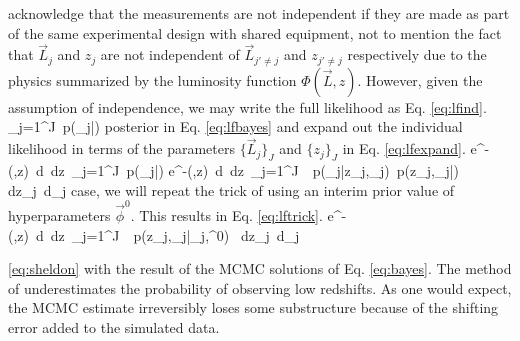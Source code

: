 \documentclass[preprint]{aastex}
\begin{document}
acknowledge that the measurements are not independent if they are made as part 
of the same experimental design with shared equipment, not to mention the fact 
that $\vec{L}_{j}$ and $z_{j}$ are not independent of $\vec{L}_{j'\neq j}$ and 
$z_{j'\neq j}$ respectively due to the physics summarized by the luminosity 
function $\Phi(\vec{L},z)$.  However, given the assumption of independence, we 
may write the full likelihood as Eq. \ref{eq:lfind}.  
%
\prod_{j=1}^{J}\ p(_{j}|\vec{\phi})
%
posterior in Eq. \ref{eq:lfbayes} and expand out the individual likelihood in 
terms of the parameters $\{\vec{L}_{j}\}_{J}$ and $\{z_{j}\}_{J}$ in Eq. 
\ref{eq:lfexpand}.
%
e^{-\iint \Phi(,z)\ 
d\ dz}\ \prod_{j=1}^{J}\ p(_{j}|\vec{\phi})
%
e^{-\iint \Phi(,z)\ 
d\ dz}\ \prod_{j=1}^{J}\ \iint\ p(_{j}|z_{j},_{j})\ 
p(z_{j},_{j}|\vec{\phi}) dz_{j}\ d_{j}
%
case, we will repeat the trick of using an interim prior value of 
hyperparameters $\vec{\phi}^{0}$.  This results in Eq. \ref{eq:lftrick}.
%
e^{-\iint \Phi(,z)\ 
d\ dz}\ \prod_{j=1}^{J}\ \iint\ 
p(z_{j},_{j}|_{j},\vec{\phi}^{0})\ 
dz_{j}\ d\vec{L}_{j}

\ref{eq:sheldon} with the result of the MCMC solutions of Eq. \ref{eq:bayes}.  
The method of \citet{Sheldon2012} underestimates the probability of observing 
low redshifts.  As one would expect, the MCMC estimate irreversibly loses some 
substructure because of the shifting error added to the simulated data.
\end{document}
